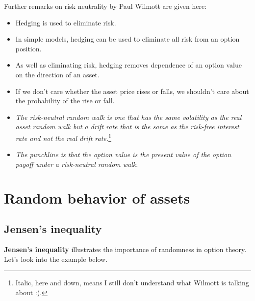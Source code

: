 Further remarks on risk neutrality by Paul Wilmott are given here:
\begin{itemize}
    \setlength\itemsep{0em}
    \item Hedging is used to eliminate risk.
    \item In simple models, hedging can be used to eliminate all risk from an option position.
    \item As well as eliminating risk, hedging removes dependence of an option value on the direction of an asset.
    \item If we don't care whether the asset price rises or falls, we shouldn't care about the probability of the rise or fall.
    \item \textit{The risk-neutral random walk is one that has the same volatility as the real asset random walk but a drift rate that is the same as the risk-free interest rate and not the real drift rate.}\footnote{Italic, here and down, means I still don't understand what Wilmott is talking about :).}
    \item \textit{The punchline is that the option value is the present value of the option payoff under a risk-neutral random walk}.
\end{itemize}



\section{Random behavior of assets}
\subsection{Jensen's inequality}
\textbf{Jensen's inequality} illustrates the importance of randomness in option theory. Let's look into the example below.

